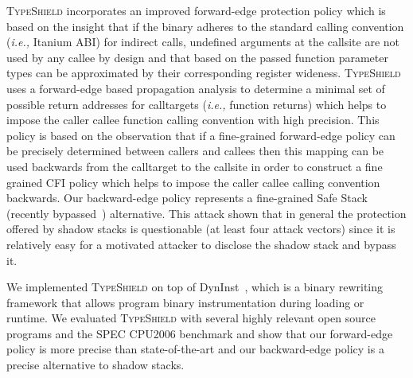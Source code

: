 \textsc{TypeShield} incorporates an improved forward-edge protection policy which is
based on the insight that if the binary adheres to the standard calling convention (\textit{i.e.,} Itanium ABI)
for indirect calls, undefined arguments at the callsite are not used by any callee by design and that based
on the passed function parameter types can be approximated by their corresponding register wideness.
\textsc{TypeShield} uses a forward-edge based propagation analysis to determine a minimal
set of possible return addresses for calltargets (\textit{i.e.,} function returns) which helps to impose the caller callee 
function calling convention with high precision. This policy is based on the observation that if a fine-grained 
forward-edge policy can be precisely determined between callers and callees then this mapping can be used backwards 
from the calltarget to the callsite in order to construct a fine grained CFI policy which helps to impose the caller callee calling convention backwards.
Our backward-edge policy represents a fine-grained Safe Stack~\cite{volodymyr:cpi} (recently bypassed~\cite{safestack:bypassing}) alternative.
This attack shown that in general the protection offered by shadow stacks is questionable (at least four attack vectors) since it is relatively 
easy for a motivated attacker to disclose the shadow stack and bypass it.

We implemented \textsc{TypeShield} on top of DynInst~\cite{bernat:dyninst}, which is
a binary rewriting framework that allows program binary instrumentation during loading or runtime.
We evaluated \textsc{TypeShield} with several highly relevant open source programs and the SPEC CPU2006 benchmark
and show that our forward-edge policy is more precise than state-of-the-art and our backward-edge policy is a precise 
alternative to shadow stacks. 

